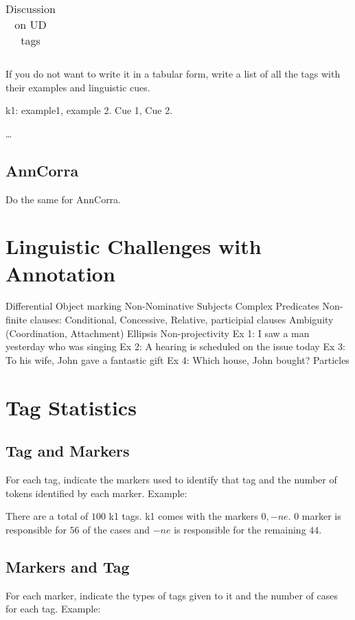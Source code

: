 \documentclass[a4 paper]{article}
\begin{document}
\begin{longtable}{cp{}p{}}
\caption{Discussion on UD tags}
\label{tab:udtable}
\end{longtable}

If you do not want to write it in a tabular form, write a list of all the tags with their examples and linguistic cues.

 k1: example1, example 2. Cue 1, Cue 2.

 \dots

\subsection{AnnCorra}
Do the same for AnnCorra.

\section{Linguistic Challenges with Annotation}

 Differential Object marking
 Non-Nominative Subjects
 Complex Predicates
 Non-finite clauses: Conditional, Concessive, Relative, participial clauses
 Ambiguity (Coordination, Attachment)
 Ellipsis
 Non-projectivity
	Ex 1: I saw a man yesterday who was singing
	Ex 2: A hearing is scheduled on the issue today
	Ex 3: To his wife, John gave a fantastic gift
	Ex 4: Which house, John bought?
 Particles

\section{Tag Statistics}

\subsection{Tag and Markers}

For each tag, indicate the markers used to identify that tag and the number of tokens identified by each marker. Example:

There are a total of $100$ k1 tags. k1 comes with the markers $0, -ne$. $0$ marker is responsible for $56$ of the cases and $-ne$ is responsible for the remaining $44$.

\subsection{Markers and Tag}

For each marker, indicate the types of tags given to it and the number of cases for each tag. Example:
\end{document}
